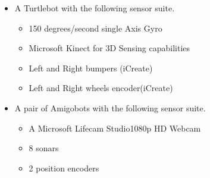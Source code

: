 \documentclass[conference]{IEEEtran}
\makeatletter
\renewcommand\subsection{\@startsection{subsection}{1}{\z@}
                                  {-2.0ex plus -1.5ex minus -0.5ex}
                                  {0.7ex plus 1ex minus 0ex}
                                  {\itshape\bfseries}}
\makeatother
\begin{document}
\begin{itemize}
\item{
A Turtlebot%
with the following sensor suite.



\begin{itemize}
\item{150 degrees/second single Axis Gyro}
\item{Microsoft Kinect  for 3D Sensing capabilities}
\item{Left and Right bumpers (iCreate)}
\item{Left and Right wheels encoder(iCreate)}
\end{itemize}
}

\item{
 A pair of Amigobots%
with the following sensor suite.


\begin{itemize}
\item{A Microsoft Lifecam Studio1080p HD Webcam}
\item{8 sonars}
\item{2 position encoders}
\end{itemize}
}
\end{itemize}
\end{document}
